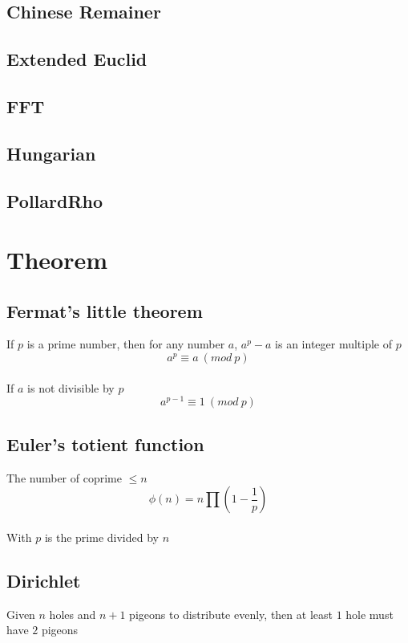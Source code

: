 \documentclass[A4 paper, 12pt, oneside]{article}
\begin{document}
\begin{multicols}{2}
	\subsection{Chinese Remainer}
	
	
	\subsection{Extended Euclid}
	

	\subsection{FFT}
	
	
	\subsection{Hungarian}
	

	\subsection{PollardRho}
	

\section{Theorem}
	\subsection{Fermat's little theorem}
	If $p$ is a prime number, then for any number $a$, \(a^p - a\) is an integer multiple of $p$ \\
	\[a ^ p \equiv a \ (mod \ p)\]  \\
	If $a$ is not divisible by $p$ \\
	\[a ^ {p - 1} \equiv 1 \ (mod \ p)\] 
	
	\subsection{Euler's totient function}
	The number of coprime $\leq n$ \\
	\[\phi(n) = n \prod (1 - \frac{1}{p}) \] \\
	With $p$ is the prime divided by $n$
	
	\subsection{Dirichlet}
	Given $n$ holes and $n + 1$ pigeons to distribute evenly, then at least $1$ hole must have $2$ pigeons
	

\end{multicols}
\end{document}
